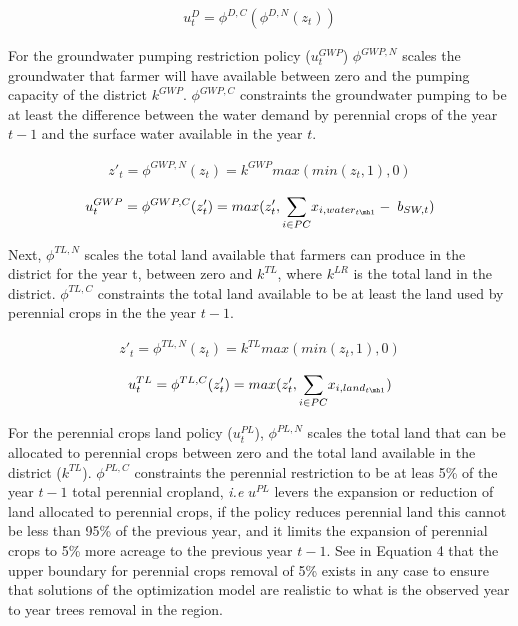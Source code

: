 \documentclass[11pt,a4paper]{article}
\begin{document}
\begin{align}
u^{D}_t = \phi^{D,C}(\phi^{D,N}(z_{t}))
\end{align}

For the groundwater pumping restriction policy ($u^{GWP}_t$) $\phi^{GWP,N}$ scales the groundwater that farmer will have available between zero and the pumping capacity of the district $k^{GWP}$. $\phi^{GWP,C}$ constraints the groundwater pumping to be at least the difference between the water demand by perennial crops of the year $t-1$ and the surface water available in the year $t$. 

\begin{align}
z'_{t}=\phi^{GWP,N}(z_{t}) = k^{GWP}max(min(z_{t},1),0) 
\end{align}

\begin{align}
u^{GWP}_t = \phi^{GWP,C}(z'_{t})= max(z'_{t},\underset{i \in PC}{\sum} x_{i,water_{t\mh1}} - \; b_{SW,t})
\end{align}

Next, $\phi^{TL,N}$ scales the total land available that farmers can produce in the district for the year t, between zero and $k^{TL}$, where $k^{LR}$ is the total land in the district. $\phi^{TL,C}$ constraints the total land available to be at least the land used by perennial crops in the the year $t-1$.

\begin{align}
z'_{t} = \phi^{TL,N}(z_{t}) = k^{TL}max(min(z_{t},1),0)
\end{align}

\begin{align}
u^{TL}_t = \phi^{TL,C}(z'_{t})= max(z'_{t},\underset{i \in PC}{\sum} x_{i,land_{t\mh1}})
\end{align}


For the perennial crops land policy ($u^{PL}_t$), $\phi^{PL,N}$ scales the total land that can be allocated to perennial crops between zero and the total land available in the district ($k^{TL}$). $\phi^{PL,C}$ constraints the perennial restriction to be at leas 5\% of the year $t-1$ total perennial cropland, \textit{i.e} $u^{PL}$ levers the expansion or reduction of land allocated to perennial crops, if the policy reduces perennial land this cannot be less than 95\% of the previous year, and it limits the expansion of perennial crops to 5\% more acreage to the previous year $t-1$. See in Equation 4 that the upper boundary for perennial crops removal of 5\% exists in any case to ensure that solutions of the optimization model are realistic to what is the observed year to year trees removal in the region.
\end{document}
